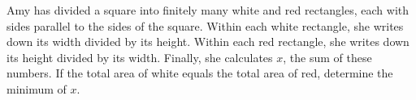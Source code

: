 Amy has divided a square into finitely many white and red rectangles, each with sides parallel to the sides of the square. Within each white rectangle, she writes down its width divided by its height. Within each red rectangle, she writes down its height divided by its width. Finally, she calculates $x$,  the sum of these numbers. If the total area of white equals the total area of red, determine the minimum of $x$.